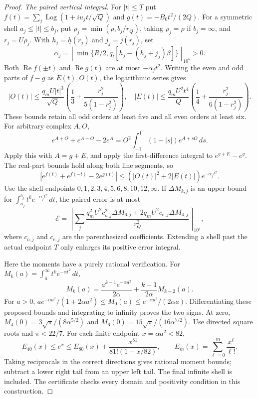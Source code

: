 \documentclass[11pt,reqno]{amsart}
\numberwithin{equation}{section}
\theoremstyle{definition}
\theoremstyle{remark}
\renewcommand{\Re}{\operatorname{Re}}
\DeclareMathOperator{\Log}{Log}
\begin{document}
\begin{proof}
\smallskip
\noindent\emph{The paired vertical integral.}
For $|t|\le T$ put
$f(t)=\sum_j\Log(1+iu_jt/\sqrt Q)$ and
$g(t)=-B_0t^2/(2Q)$. For a symmetric shell
$a_j\le|t|\le b_j$, put
$\rho_j=\min(\rho,b_j/r_Q)$, taking $\rho_j=\rho$ if $b_j=\infty$,
and $r_j=U\rho_j$. With $h_j=\underline h(r_j)$ and
$j_j=\overline j(r_j)$, set
\[
 \alpha_j=\left\lfloor\min\{R/2,
                q_l[h_j-(h_j+j_j)\beta]\}\right\rfloor_{10^5}>0.
\]
Both $\Re f(\pm t)$ and $\Re g(t)$ are at most $-\alpha_jt^2$.
Writing the even and odd parts of $f-g$ as $E(t),O(t)$,
the logarithmic series gives
\[
 |O(t)|\le\frac{q_mU|t|^3}{\sqrt Q}
       \left(\frac13+\frac{r_j^2}{5(1-r_j^2)}\right),\quad
 |E(t)|\le\frac{q_mU^2t^4}{Q}
       \left(\frac14+\frac{r_j^2}{6(1-r_j^2)}\right).
\]
These bounds retain all odd orders at least five and all even
orders at least six. For arbitrary complex $A,O$,
\[
 e^{A+O}+e^{A-O}-2e^A
 =O^2\int_{-1}^1(1-|s|)e^{A+sO}\,ds.
\]
Apply this with $A=g+E$, and apply the first-difference integral
to $e^{g+E}-e^g$. The real-part bounds hold along both line
segments, so
\[
 |e^{f(t)}+e^{f(-t)}-2e^{g(t)}|
 \le(|O(t)|^2+2|E(t)|)e^{-\alpha_jt^2}.
\]
Use the shell endpoints $0,1,2,3,4,5,6,8,10,12,\infty$.
If $\Delta M_{k,j}$ is an upper bound for
$\int_{a_j}^{b_j}t^ke^{-\alpha_jt^2}\,dt$, the
paired error is at most
\[
 \mathcal E=\left\lceil\sum_j
 \frac{q_m^2U^2c_{o,j}^2\Delta M_{6,j}
          +2q_mU^2c_{e,j}\Delta M_{4,j}}{r_Q^2}
                      \right\rceil_{10^4},
\]
where $c_{o,j}$ and $c_{e,j}$ are the parenthesized coefficients.
Extending a shell past the actual endpoint $T$ only enlarges its
positive error integral.

Here the moments have a purely rational verification. For
$M_k(a)=\int_a^\infty t^ke^{-\alpha t^2}\,dt$,
\[
 M_k(a)=\frac{a^{k-1}e^{-\alpha a^2}}{2\alpha}
          +\frac{k-1}{2\alpha}M_{k-2}(a).
\]
For $a>0$,
$ae^{-\alpha a^2}/(1+2\alpha a^2)\le M_0(a)
 \le e^{-\alpha a^2}/(2\alpha a)$.
Differentiating these proposed bounds and integrating to infinity
proves the two signs. At zero,
$M_4(0)=3\sqrt\pi/(8\alpha^{5/2})$ and
$M_6(0)=15\sqrt\pi/(16\alpha^{7/2})$.
Use directed square roots and $\pi<22/7$.
For each finite endpoint $x=\alpha a^2<82$,
\[
 E_{40}(x)\le e^x\le E_{80}(x)
               +\frac{x^{81}}{81!(1-x/82)},\qquad
 E_m(x)=\sum_{\ell=0}^m\frac{x^\ell}{\ell!}.
\]
Taking reciprocals in the correct directions gives rational
moment bounds; subtract a lower right tail from an upper left
tail. The final infinite shell is included. The certificate
checks every domain and positivity condition in this construction.


\end{proof}
\end{document}
